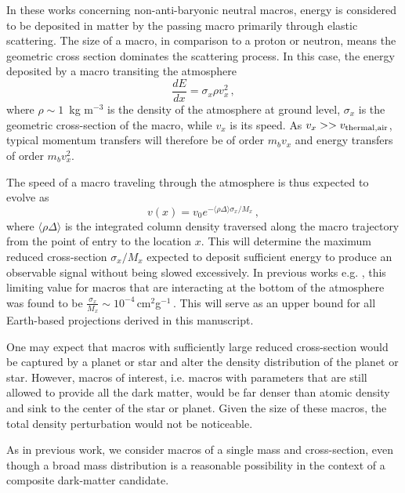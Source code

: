 \documentclass[%
 reprint,
 amsmath,amssymb,
 aps,
]{revtex4-2}
\newcommand{\vtwo}[1]{{\color{red} #1}}
\begin{document}
    In these works concerning non-anti-baryonic neutral macros, energy is considered to be deposited in matter by the passing macro primarily through elastic scattering. \vtwo{The size of a macro, in comparison to a proton or neutron, means the \vtwo{geometric} cross section dominates the scattering process.} In this case, the energy deposited by a macro transiting the atmosphere 
    \begin{equation}\label{eq:dedx}
        \frac{dE}{dx} = \sigma_x \rho v_x^2\,,
    \end{equation}
    where $\rho \sim 1\,$ kg m$^{-3}$ is the density of the atmosphere at ground level, $\sigma_x$ is the \vtwo{geometric} cross-section of the macro, while $v_x$ is its speed. \vtwo{As $v_{x} >> v_{\rm{thermal, air}}$, typical momentum transfers will therefore be of order $m_b v_{x}$ and energy transfers of order $m_b v_{x}^2$.}

    The speed of a macro traveling through the atmosphere is thus expected to evolve as
    \begin{equation}\label{eq:atmo_velocity}
        v(x) = v_{0} e^{-\langle \rho \Delta\rangle \sigma_x/{M_x}}\,,
    \end{equation}
    where $\langle \rho \Delta\rangle$ is the integrated column density traversed along the macro trajectory from the point of entry to the location $x$. This will determine the maximum reduced cross-section $\sigma_x/M_x$ expected to deposit sufficient energy to produce an observable signal without being slowed excessively. In previous works e.g. \vtwo{\citet{Sidhu2019death, Sidhu2019bolide}}, this limiting value for macros that are interacting at the bottom of the atmosphere was found to be $\frac{\sigma_x}{M_x} \sim 10^{-4}\,$cm$^2$g$^{-1}\,$. This will serve as an upper bound for all Earth-based projections derived in this manuscript.

    \vtwo{One may expect that macros with sufficiently large reduced cross-section would be captured by a planet or star and alter the density distribution of the planet or star. However, macros of interest, i.e. macros with parameters that are still allowed to provide all the dark matter, would be far denser than atomic density and sink to the center of the star or planet. Given the size of these macros, the total density perturbation would not be noticeable.}

    As in previous work, we consider macros of a single mass and cross-section, even though a broad mass distribution is a reasonable possibility in the context of a composite dark-matter candidate.
\end{document}
